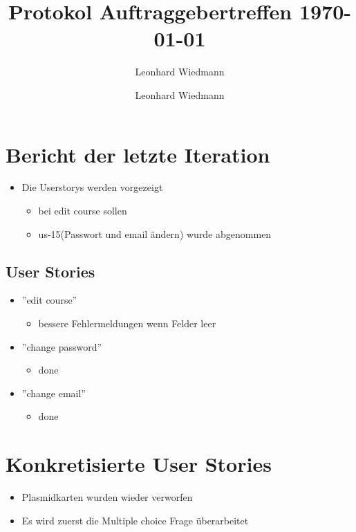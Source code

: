 \documentclass[colorback, accentcolor=tud1c, paper=a4]{tudexercise}
\title{Protokol Auftraggebertreffen \today}
\subtitle{Leonhard Wiedmann}
\author{Leonhard Wiedmann}
\begin{document}
\maketitle

\begin{multicols}{2}

\section{Bericht der letzte Iteration}
\begin{itemize}
	\item Die Userstorys werden vorgezeigt
	\begin{itemize}
		\item bei edit course sollen
		\item us-15(Passwort und email ändern) wurde abgenommen
	\end{itemize}
\end{itemize}

\subsection{User Stories}
\begin{itemize}
	\item ''edit course''
	\begin{itemize}
		\item bessere Fehlermeldungen wenn Felder leer
	\end{itemize}
	\item ''change password''
	\begin{itemize}
		\item done
	\end{itemize}
	\item ''change email''
	\begin{itemize}
		\item done
	\end{itemize}
\end{itemize}

\section{Konkretisierte User Stories}
\begin{itemize}
	\item Plasmidkarten wurden wieder verworfen
	\item Es wird zuerst die Multiple choice Frage überarbeitet
\end{itemize}


\end{multicols}
\end{document}
